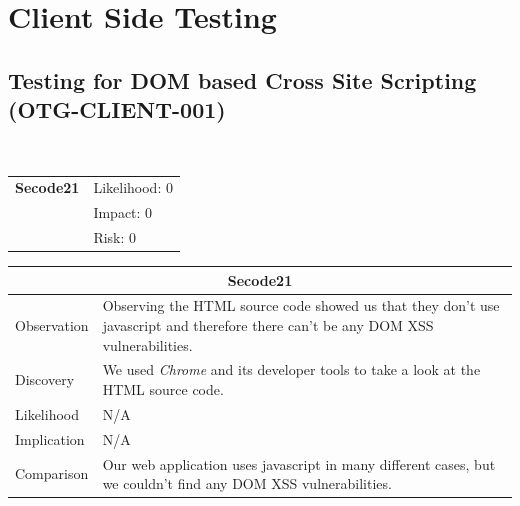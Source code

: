\documentclass[headsepline,footsepline,footinclude=false,oneside,fontsize=11pt,paper=a4,listof=totoc,bibliography=totoc]{scrbook} %
\begin{document}
\section{Client Side Testing}

\subsection{Testing for DOM based Cross Site Scripting (OTG-CLIENT-001)}\

\begin{tabular}{cR{12cm}}
	\textbf{Secode21} & Likelihood: 0\\& Impact: 0\\& Risk: 0
\end{tabular}

\begin{tabular}{ l|p{11cm}  }
	\hline
	\multicolumn{2}{c}{\textbf{Secode21}} \\
	\hline
	Observation   & Observing the HTML source code showed us that they don't use javascript and therefore there can't be any DOM XSS vulnerabilities. \\
	Discovery  & We used \textit{Chrome} and its developer tools to take a look at the HTML source code. \\
	Likelihood & N/A \\
	Implication    & N/A \\
	Comparison & Our web application uses javascript in many different cases, but we couldn't find any DOM XSS vulnerabilities. \\
	\hline
\end{tabular}
\\
\vspace{0.5cm}
\\
\end{document}
